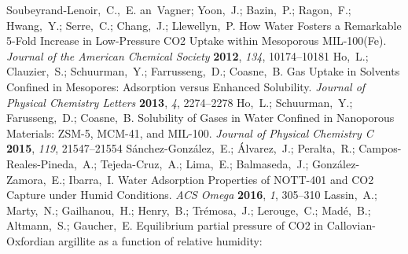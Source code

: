 \documentclass[aps,prl,twocolumn,superscriptaddress,groupedaddress]{revtex4}
\begin{document}
\begin{mcitethebibliography}{88}
\EndOfBibitem
{}
Soubeyrand-Lenoir,~C.,~E. an~Vagner; Yoon,~J.; Bazin,~P.; Ragon,~F.; Hwang,~Y.;
  Serre,~C.; Chang,~J.; Llewellyn,~P. How Water Fosters a Remarkable 5-Fold
  Increase in Low-Pressure CO2 Uptake within Mesoporous MIL-100(Fe).
  \emph{Journal of the American Chemical Society} \textbf{2012}, \emph{134},
  10174--10181\relax
\mciteBstWouldAddEndPuncttrue
\mciteSetBstMidEndSepPunct{\mcitedefaultmidpunct}
{\mcitedefaultendpunct}{\mcitedefaultseppunct}\relax
\EndOfBibitem
{}
Ho,~L.; Clauzier,~S.; Schuurman,~Y.; Farrusseng,~D.; Coasne,~B. Gas Uptake in
  Solvents Confined in Mesopores: Adsorption versus Enhanced Solubility.
  \emph{Journal of Physical Chemistry Letters} \textbf{2013}, \emph{4},
  2274--2278\relax
\mciteBstWouldAddEndPuncttrue
\mciteSetBstMidEndSepPunct{\mcitedefaultmidpunct}
{\mcitedefaultendpunct}{\mcitedefaultseppunct}\relax
\EndOfBibitem
{}
Ho,~L.; Schuurman,~Y.; Farusseng,~D.; Coasne,~B. Solubility of Gases in Water
  Confined in Nanoporous Materials: ZSM-5, MCM-41, and MIL-100. \emph{Journal
  of Physical Chemistry C} \textbf{2015}, \emph{119}, 21547--21554\relax
\mciteBstWouldAddEndPuncttrue
\mciteSetBstMidEndSepPunct{\mcitedefaultmidpunct}
{\mcitedefaultendpunct}{\mcitedefaultseppunct}\relax
\EndOfBibitem
{}
S{\'a}nchez-Gonz{\'a}lez,~E.; {\'A}lvarez,~J.; Peralta,~R.;
  Campos-Reales-Pineda,~A.; Tejeda-Cruz,~A.; Lima,~E.; Balmaseda,~J.;
  Gonz{\'a}lez-Zamora,~E.; Ibarra,~I. Water Adsorption Properties of NOTT-401
  and CO2 Capture under Humid Conditions. \emph{ACS Omega} \textbf{2016},
  \emph{1}, 305--310\relax
\mciteBstWouldAddEndPuncttrue
\mciteSetBstMidEndSepPunct{\mcitedefaultmidpunct}
{\mcitedefaultendpunct}{\mcitedefaultseppunct}\relax
\EndOfBibitem
{}
Lassin,~A.; Marty,~N.; Gailhanou,~H.; Henry,~B.; Tr{\'e}mosa,~J.; Lerouge,~C.;
  Mad{\'e},~B.; Altmann,~S.; Gaucher,~E. Equilibrium partial pressure of CO2 in
  Callovian-Oxfordian argillite as a function of relative humidity:

\end{mcitethebibliography}
\end{document}
